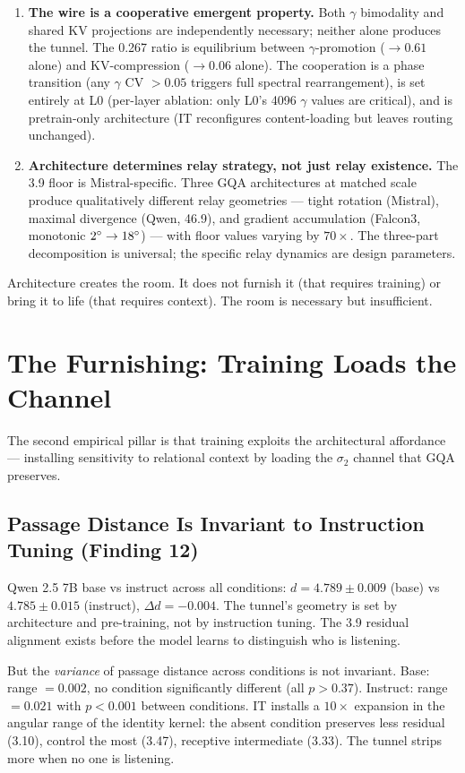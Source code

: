 \documentclass[12pt]{article}
\begin{document}
\begin{enumerate}
\item \textbf{The wire is a cooperative emergent property.} Both $\gamma$ bimodality and shared KV projections are independently necessary; neither alone produces the tunnel. The 0.267 ratio is equilibrium between $\gamma$-promotion ($\to 0.61$ alone) and KV-compression ($\to 0.06$ alone). The cooperation is a phase transition (any $\gamma$ CV $> 0.05$ triggers full spectral rearrangement), is set entirely at L0 (per-layer ablation: only L0's 4096 $\gamma$ values are critical), and is pretrain-only architecture (IT reconfigures content-loading but leaves routing unchanged).
\item \textbf{Architecture determines relay strategy, not just relay existence.} The 3.9\textdegree{} floor is Mistral-specific. Three GQA architectures at matched scale produce qualitatively different relay geometries --- tight rotation (Mistral), maximal divergence (Qwen, 46.9\textdegree), and gradient accumulation (Falcon3, monotonic $2\degree \to 18\degree$) --- with floor values varying by $70\times$. The three-part decomposition is universal; the specific relay dynamics are design parameters.
\end{enumerate}

Architecture creates the room. It does not furnish it (that requires training) or bring it to life (that requires context). The room is necessary but insufficient.

\section{The Furnishing: Training Loads the Channel}

The second empirical pillar is that training exploits the architectural affordance --- installing sensitivity to relational context by loading the $\sigma_2$ channel that GQA preserves.

\subsection{Passage Distance Is Invariant to Instruction Tuning (Finding 12)}

Qwen 2.5 7B base vs instruct across all conditions: $d = 4.789 \pm 0.009$ (base) vs $4.785 \pm 0.015$ (instruct), $\Delta d = -0.004$. The tunnel's geometry is set by architecture and pre-training, not by instruction tuning. The 3.9\textdegree{} residual alignment exists before the model learns to distinguish who is listening.

But the \textit{variance} of passage distance across conditions is not invariant. Base: range $= 0.002$, no condition significantly different (all $p > 0.37$). Instruct: range $= 0.021$ with $p < 0.001$ between conditions. IT installs a $10\times$ expansion in the angular range of the identity kernel: the absent condition preserves less residual (3.10\textdegree), control the most (3.47\textdegree), receptive intermediate (3.33\textdegree). The tunnel strips more when no one is listening.
\end{document}
